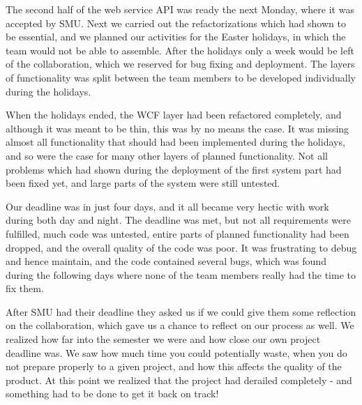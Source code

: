 The second half of the web service API was ready the next Monday, where it was accepted by SMU. Next we carried out the refactorizations which had shown to be essential, and we planned our activities for the Easter holidays, in which the team would not be able to assemble. After the holidays only a week would be left of the collaboration, which we reserved for bug fixing and deployment. The layers of functionality was split between the team members to be developed individually during the holidays.

When the holidays ended, the WCF layer had been refactored completely, and although it was meant to be thin, this was by no means the case. It was missing almost all functionality that should had been implemented during the holidays, and so were the case for many other layers of planned functionality.
Not all problems which had shown during the deployment of the first system part had been fixed yet, and large parts of the system were still untested.

Our deadline was in just four days, and it all became very hectic with work during both day and night. The deadline was met, but not all requirements were fulfilled, much code was untested, entire parts of planned functionality had been dropped, and the overall quality of the code was poor. It was frustrating to debug and hence maintain, and the code contained several bugs, which was found during the following days where none of the team members really had the time to fix them.

After SMU had their deadline they asked us if we could give them some reflection on the collaboration, which gave us a chance to reflect on our process as well. We realized how far into the semester we were and how close our own project deadline was. We saw how much time you could potentially waste, when you do not prepare properly to a given project, and how this affects the quality of the product. At this point we realized that the project had derailed completely - and something had to be done to get it back on track!
\newpage